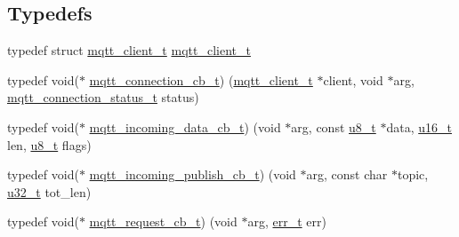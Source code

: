 \subsection*{Typedefs}
\begin{DoxyCompactItemize}
\item 
typedef struct \hyperlink{structmqtt__client__t}{mqtt\+\_\+client\+\_\+t} \hyperlink{openmote-cc2538_2lwip_2src_2include_2lwip_2apps_2mqtt_8h_a3fa4eba06ca6187c7a8a8e7cb22b7e96}{mqtt\+\_\+client\+\_\+t}
\item 
typedef void($\ast$ \hyperlink{group__mqtt_ga8558743bdb7d599a93844fbc56c9029f}{mqtt\+\_\+connection\+\_\+cb\+\_\+t}) (\hyperlink{structmqtt__client__t}{mqtt\+\_\+client\+\_\+t} $\ast$client, void $\ast$arg, \hyperlink{group__mqtt_ga8cf0f360ab20343af37e1d124395a77d}{mqtt\+\_\+connection\+\_\+status\+\_\+t} status)
\item 
typedef void($\ast$ \hyperlink{group__mqtt_gafec7e75fe6a746eef9ca411463446c81}{mqtt\+\_\+incoming\+\_\+data\+\_\+cb\+\_\+t}) (void $\ast$arg, const \hyperlink{group__compiler__abstraction_ga4caecabca98b43919dd11be1c0d4cd8e}{u8\+\_\+t} $\ast$data, \hyperlink{group__compiler__abstraction_ga77570ac4fcab86864fa1916e55676da2}{u16\+\_\+t} len, \hyperlink{group__compiler__abstraction_ga4caecabca98b43919dd11be1c0d4cd8e}{u8\+\_\+t} flags)
\item 
typedef void($\ast$ \hyperlink{group__mqtt_ga7116bb85255394cec4b1d9fa38842c29}{mqtt\+\_\+incoming\+\_\+publish\+\_\+cb\+\_\+t}) (void $\ast$arg, const char $\ast$topic, \hyperlink{group__compiler__abstraction_ga4c14294869aceba3ef9d4c0c302d0f33}{u32\+\_\+t} tot\+\_\+len)
\item 
typedef void($\ast$ \hyperlink{group__mqtt_gacad2bbe2cee76eaa120cc63e2f6094fd}{mqtt\+\_\+request\+\_\+cb\+\_\+t}) (void $\ast$arg, \hyperlink{group__infrastructure__errors_gaf02d9da80fd66b4f986d2c53d7231ddb}{err\+\_\+t} err)
\end{DoxyCompactItemize}
